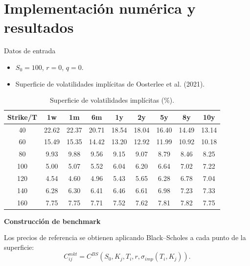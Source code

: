 \documentclass[8pt]{beamer}
\begin{document}
\section{Implementación numérica y resultados}

\begin{frame}{Datos de entrada}
    \begin{itemize}
        \item $S_0 = 100$, $r = 0$, $q = 0$.
        \item Superficie de volatilidades implícitas de Oosterlee et al. (2021).
    \end{itemize}
    
    \vspace{0.2cm}
    \begin{table}
    \centering
    \scriptsize
    \begin{tabular}{c|cccccccc}
    \hline
    \textbf{Strike/T} & \textbf{1w} & \textbf{1m} & \textbf{6m} & \textbf{1y} & \textbf{2y} & \textbf{5y} & \textbf{8y} & \textbf{10y} \\
    \hline
    40  & 22.62 & 22.37 & 20.71 & 18.54 & 18.04 & 16.40 & 14.49 & 13.14 \\
    60  & 15.49 & 15.35 & 14.42 & 13.20 & 12.92 & 11.99 & 10.92 & 10.18 \\
    80  & 9.93  & 9.88  & 9.56  & 9.15  & 9.07  & 8.79  & 8.46  & 8.25  \\
    100 & 5.00  & 5.07  & 5.52  & 6.04  & 6.20  & 6.64  & 7.02  & 7.22  \\
    120 & 4.54  & 4.60  & 4.96  & 5.43  & 5.65  & 6.28  & 6.78  & 7.04  \\
    140 & 6.28  & 6.30  & 6.41  & 6.46  & 6.61  & 6.98  & 7.23  & 7.33  \\
    160 & 7.75  & 7.75  & 7.71  & 7.52  & 7.62  & 7.81  & 7.82  & 7.75  \\
    \hline
    \end{tabular}
    \caption{Superficie de volatilidades implícitas (\%).}
    \end{table}
    \pause
    
    \textbf{Construcción de benchmark}

Los precios de referencia se obtienen aplicando Black--Scholes a cada punto de la superficie:
    \[
    C_{ij}^{mkt} = C^{BS}(S_0, K_j, T_i, r, \sigma_{imp}(T_i,K_j)).
    \]

\end{frame}
\end{document}
